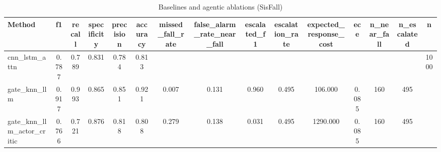 \begin{table}[t]
\centering
\caption{Baselines and agentic ablations (SisFall)}
\begin{tabular}{lcccccccccccccc}
\toprule
Method & f1 & recall & specificity & precision & accuracy & missed_fall_rate & false_alarm_rate_near_fall & escalated_f1 & escalation_rate & expected_response_cost & ece & n_near_fall & n_escalated & n \\
\midrule
cnn_lstm_attn & 0.787 & 0.789 & 0.831 & 0.784 & 0.813 &  &  &  &  &  &  &  &  & 1000 \\
gate_knn_llm & 0.917 & 0.993 & 0.865 & 0.851 & 0.921 & 0.007 & 0.131 & 0.960 & 0.495 & 106.000 & 0.085 & 160 & 495 &  \\
gate_knn_llm_actor_critic & 0.766 & 0.721 & 0.876 & 0.818 & 0.808 & 0.279 & 0.138 & 0.031 & 0.495 & 1290.000 & 0.085 & 160 & 495 &  \\
\bottomrule
\end{tabular}
\end{table}